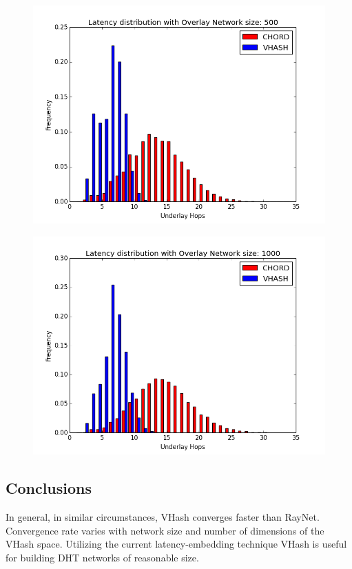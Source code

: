 \documentclass{IEEEtran}
\begin{document}
\begin{figure}
	\centering
	\includegraphics[width=\linewidth]{hist_500}
	\label{hist500}
\end{figure}

\begin{figure}
	\centering
	\includegraphics[width=\linewidth]{hist_1000}
	\label{hist1000}
\end{figure}



\subsection{Conclusions}
In general, in similar circumstances, VHash converges faster than RayNet.
Convergence rate varies with network size and number of dimensions of the VHash space.
Utilizing the current latency-embedding technique VHash is useful for building DHT networks of reasonable size.
\end{document}
